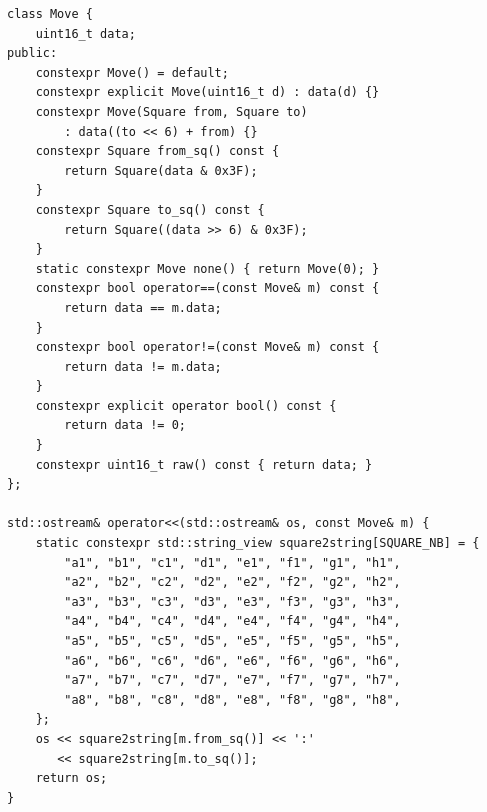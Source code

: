 \documentclass[12pt,a4paper,twoside,openright]{book}
\begin{document}
\begin{mdframed}[skipabove=\baselineskip,hidealllines=true]
\begin{verbatim}
class Move {
    uint16_t data;
public:
    constexpr Move() = default;
    constexpr explicit Move(uint16_t d) : data(d) {}
    constexpr Move(Square from, Square to)
        : data((to << 6) + from) {}
    constexpr Square from_sq() const {
        return Square(data & 0x3F);
    }
    constexpr Square to_sq() const {
        return Square((data >> 6) & 0x3F);
    }
    static constexpr Move none() { return Move(0); }
    constexpr bool operator==(const Move& m) const {
        return data == m.data;
    }
    constexpr bool operator!=(const Move& m) const {
        return data != m.data;
    }
    constexpr explicit operator bool() const {
        return data != 0;
    }
    constexpr uint16_t raw() const { return data; }
};

std::ostream& operator<<(std::ostream& os, const Move& m) {
    static constexpr std::string_view square2string[SQUARE_NB] = {
        "a1", "b1", "c1", "d1", "e1", "f1", "g1", "h1",
        "a2", "b2", "c2", "d2", "e2", "f2", "g2", "h2",
        "a3", "b3", "c3", "d3", "e3", "f3", "g3", "h3",
        "a4", "b4", "c4", "d4", "e4", "f4", "g4", "h4",
        "a5", "b5", "c5", "d5", "e5", "f5", "g5", "h5",
        "a6", "b6", "c6", "d6", "e6", "f6", "g6", "h6",
        "a7", "b7", "c7", "d7", "e7", "f7", "g7", "h7",
        "a8", "b8", "c8", "d8", "e8", "f8", "g8", "h8",
    };
    os << square2string[m.from_sq()] << ':' 
       << square2string[m.to_sq()];
    return os;
}
\end{verbatim}
\label{lst:move_struct}
\end{mdframed} 
\end{document}
